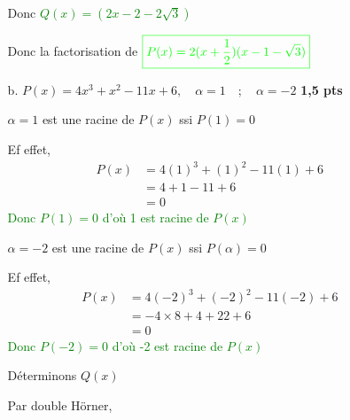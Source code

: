 \documentclass[12pt]{article}
\begin{document}
\begin{itemize}
\begin{itemize}
Donc \underline{\textcolor{green}{$Q(x)=(2x-2-2\sqrt{3})$}}

Donc la factorisation de $\textcolor{green}{\boxed{P(x)=2(x+\frac{1}{2})(x-1-\sqrt{3})}}$

\item[b.] $P(x)=4x^{3}+x^{2}-11x+6,\quad \alpha=1\quad;\quad \alpha=-2$ \textbf{1,5 pts}

$\alpha=1$ est une racine de $P(x)$ ssi $P(1)=0$

Ef effet, 
\begin{align*}
P(x)&=4(1)^{3}+(1)^{2}-11(1)+6\\
	&=4+1-11+6\\
	&=0
\end{align*}
\textcolor{green}{Donc $P(1)=0$ d'où 1 est racine de $P(x)$}

$\alpha=-2$ est une racine de $P(x)$ ssi $P(\alpha)=0$

Ef effet, 
\begin{align*}
P(x)&=4(-2)^{3}+(-2)^{2}-11(-2)+6\\
	&=-4\times 8+4+22+6\\
	&=0
\end{align*}
\textcolor{green}{Donc $P(-2)=0$ d'où -2 est racine de $P(x)$}

Déterminons $Q(x)$

Par double Hörner,


\end{itemize}
\end{itemize}
\end{document}
